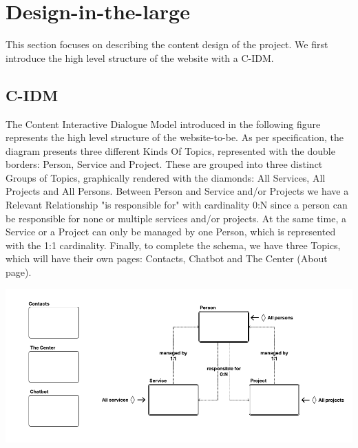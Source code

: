 



\section{Design-in-the-large}
This section focuses on describing the content design of the project. We first introduce the high level structure of the website with a C-IDM.

\subsection{C-IDM}
The Content Interactive Dialogue Model introduced in the following figure represents the high level structure of the website-to-be.
As per specification, the diagram presents three different Kinds Of Topics, represented with the double borders: Person, Service and Project.
These are grouped into three distinct Groups of Topics, graphically rendered with the diamonds: All Services, All Projects and All Persons.
Between Person and Service and/or Projects we have a Relevant Relationship "is responsible for" with cardinality 0:N since a person can be responsible
for none or multiple services and/or projects. At the same time, a Service or a Project can only be managed by one Person, which is represented with the 1:1 cardinality.
Finally, to complete the schema, we have three Topics, which will have their own pages: Contacts, Chatbot and The Center (About page).

\includegraphics[width=1\linewidth]{img/design-document/C-IDM.png}

